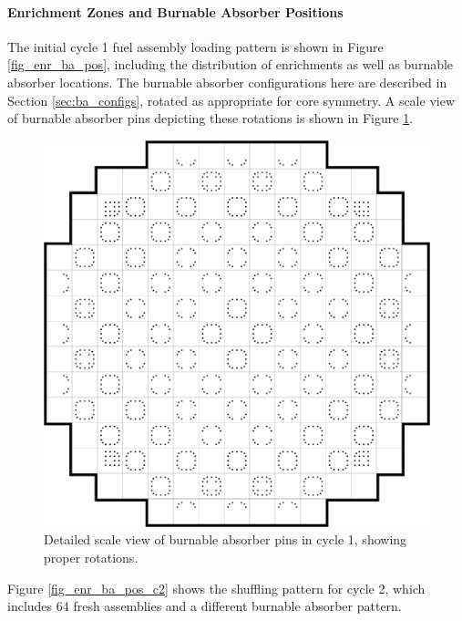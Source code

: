 \paragraph{Enrichment Zones and Burnable Absorber Positions}
\label{sec:corespec_enrba}

The initial cycle 1 fuel assembly loading pattern is shown in Figure
\ref{fig_enr_ba_pos}, including the distribution of enrichments as well as
burnable absorber locations.  The burnable absorber configurations here are
described in Section \ref{sec:ba_configs}, rotated as appropriate for core
symmetry.  A scale view of burnable absorber pins depicting these rotations is
shown in Figure \ref{fig_ba_pos_real}.


\begin{figure}[htbp]
    \centering
    \includegraphics[width=6in]{specifications/core/figs/cat_ba_positions.png}
    \caption[Cycle 1 detailed burnable absorber view]{Detailed scale view of
    burnable absorber pins in cycle 1, showing proper rotations.
    \label{fig_ba_pos_real}}
\end{figure}

Figure \ref{fig_enr_ba_pos_c2} shows the shuffling pattern for cycle 2, which
includes 64 fresh assemblies and a different burnable absorber pattern.

